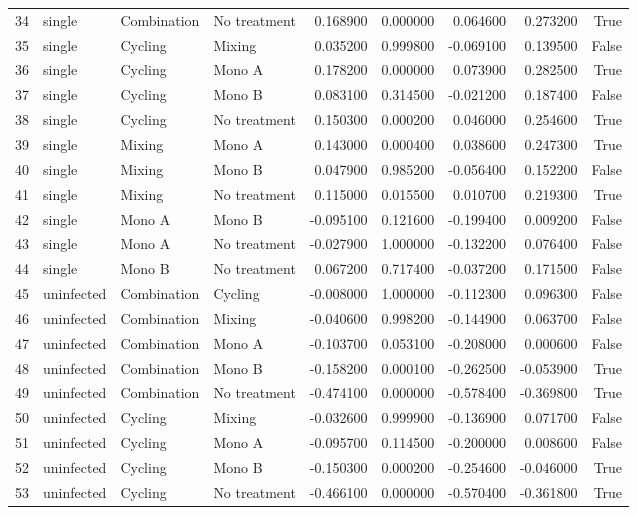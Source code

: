 \begin{tabular}{llllrrrrr}
34 & single & Combination & No treatment & 0.168900 & 0.000000 & 0.064600 & 0.273200 & True \\
35 & single & Cycling & Mixing & 0.035200 & 0.999800 & -0.069100 & 0.139500 & False \\
36 & single & Cycling & Mono A & 0.178200 & 0.000000 & 0.073900 & 0.282500 & True \\
37 & single & Cycling & Mono B & 0.083100 & 0.314500 & -0.021200 & 0.187400 & False \\
38 & single & Cycling & No treatment & 0.150300 & 0.000200 & 0.046000 & 0.254600 & True \\
39 & single & Mixing & Mono A & 0.143000 & 0.000400 & 0.038600 & 0.247300 & True \\
40 & single & Mixing & Mono B & 0.047900 & 0.985200 & -0.056400 & 0.152200 & False \\
41 & single & Mixing & No treatment & 0.115000 & 0.015500 & 0.010700 & 0.219300 & True \\
42 & single & Mono A & Mono B & -0.095100 & 0.121600 & -0.199400 & 0.009200 & False \\
43 & single & Mono A & No treatment & -0.027900 & 1.000000 & -0.132200 & 0.076400 & False \\
44 & single & Mono B & No treatment & 0.067200 & 0.717400 & -0.037200 & 0.171500 & False \\
45 & uninfected & Combination & Cycling & -0.008000 & 1.000000 & -0.112300 & 0.096300 & False \\
46 & uninfected & Combination & Mixing & -0.040600 & 0.998200 & -0.144900 & 0.063700 & False \\
47 & uninfected & Combination & Mono A & -0.103700 & 0.053100 & -0.208000 & 0.000600 & False \\
48 & uninfected & Combination & Mono B & -0.158200 & 0.000100 & -0.262500 & -0.053900 & True \\
49 & uninfected & Combination & No treatment & -0.474100 & 0.000000 & -0.578400 & -0.369800 & True \\
50 & uninfected & Cycling & Mixing & -0.032600 & 0.999900 & -0.136900 & 0.071700 & False \\
51 & uninfected & Cycling & Mono A & -0.095700 & 0.114500 & -0.200000 & 0.008600 & False \\
52 & uninfected & Cycling & Mono B & -0.150300 & 0.000200 & -0.254600 & -0.046000 & True \\
53 & uninfected & Cycling & No treatment & -0.466100 & 0.000000 & -0.570400 & -0.361800 & True \\

\end{tabular}
